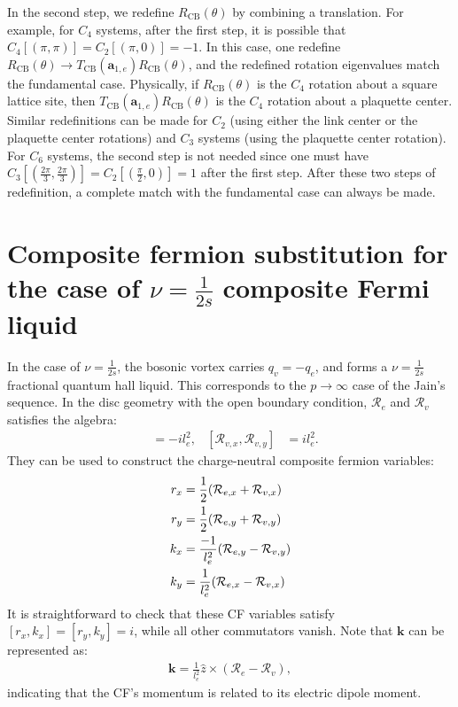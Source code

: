 \begin{subappendices}
    In the second step, we redefine $R_{\text{CB}}(\theta)$ by combining a translation. For example, for $C_4$ systems, after the first step, it is possible that $C_4[(\pi,\pi)]=C_2[(\pi,0)]=-1$. In this case, one redefine $R_{\text{CB}}(\theta)\rightarrow T_{\text{CB}}(\mathbf a_{1,e})R_{\text{CB}}(\theta)$, and the redefined rotation eigenvalues match the fundamental case. Physically, if $R_{\text{CB}}(\theta)$ is the $C_4$ rotation about a square lattice site, then $T_{\text{CB}}(\mathbf a_{1,e})R_{\text{CB}}(\theta)$ is the $C_4$ rotation about a plaquette center. Similar redefinitions can be made for $C_2$ (using either the link center or the plaquette center rotations) and $C_3$ systems (using the plaquette center rotation). For $C_6$ systems, the second step is not needed since one must have $C_3[(\frac{2\pi}{3},\frac{2\pi}{3})]=C_2[(\frac{\pi}{2},0)]=1$ after the first step. After these two steps of redefinition, a complete match with the fundamental case can always be made.

    \section{Composite fermion substitution for the case of $\nu=\frac{1}{2s}$ composite Fermi liquid}\label{app:CFL_substitution}
    In the case of $\nu=\frac{1}{2s}$, the bosonic vortex carries $q_v=-q_e$, and forms a $\nu=\frac{1}{2s}$ fractional quantum hall liquid. This corresponds to the $p\rightarrow\infty$ case of the Jain's sequence. In the disc geometry with the open boundary condition, $\mathcal R_e$ and $\mathcal R_v$ satisfies the algebra:
    \begin{align}
        [\mathcal R_{e,x},\mathcal R_{e,y}] & =-il_e^2, & [\mathcal R_{v,x},\mathcal R_{v,y}] & =il_e^2.
    \end{align}
    They can be used to construct the charge-neutral composite fermion variables:
    \begin{align}
        r_x & =\frac{1}{2}(\mathcal R_{e,x}+\mathcal R_{v,x})\notag      \\
        r_y & =\frac{1}{2}(\mathcal R_{e,y}+\mathcal R_{v,y})\notag      \\
        k_x & =\frac{-1}{l_e^2}(\mathcal R_{e,y}-\mathcal R_{v,y})\notag \\
        k_y & =\frac{1}{l_e^2}(\mathcal R_{e,x}-\mathcal R_{v,x})
    \end{align}
    It is straightforward to check that these CF variables satisfy $[r_x,k_x]=[r_y,k_y]=i$, while all other commutators vanish. Note that $\bm k$ can be represented as:
    \begin{align}
        \bm k=\frac{1}{l_e^2}\hat z\times(\mathcal R_e-\mathcal R_v),
    \end{align}
    indicating that the CF's momentum is related to its electric dipole moment.


\end{subappendices}
